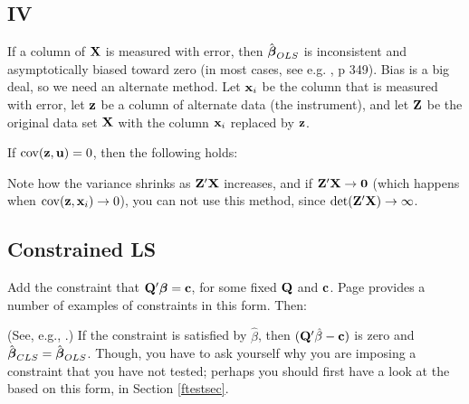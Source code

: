 
\subsection{IV}  
	\label{IV} 
If a column of ${\bf X}$ is measured with error, then $\hat{{\mbox{\boldmath$\beta$}}}_{OLS}$ is
inconsistent and asymptotically biased toward zero (in most cases, see
e.g. \cite{kmenta}, p 349). Bias is a big deal, so we need an alternate
method. Let ${\bf x}_i$ be the column that is measured with error, let
${\bf z}$ be a column of alternate data (the instrument), and let ${\bf Z}$ be
the original data set ${\bf X}$ with the column ${\bf x}_i$ replaced by ${\bf z}$.

If $\operatorname{cov}({\bf z},{\bf u})=0$, then the following holds:


Note how the variance shrinks as ${\bf Z}'{\bf X}$ increases, and if
${\bf Z}'{\bf X} \to {\bf 0}$ (which happens when $\operatorname{cov}({\bf z}, {\bf x}_i)\to 0$),
you can not use this method, since $\det({\bf Z}'{\bf X}) \to \infty$.

\subsection{Constrained LS }
\label{constrainedls}

Add the constraint that ${\bf Q}'{\mbox{\boldmath$\beta$}}={\bf c}$, for some fixed ${\bf Q}$ and ${\bf c}$. 
Page \pageref{ftestsec} provides a number of examples of constraints in
this form. Then:

(See, e.g., \cite{amemiya:ez}.)
If the constraint is satisfied by $\hat\beta$, then
$({\bf Q}'\hat\beta-{\bf c})$ is zero and $\hat{{\mbox{\boldmath$\beta$}}}_{CLS}=\hat{{\mbox{\boldmath$\beta$}}}_{OLS}$.
Though, you have to ask yourself why you are imposing a constraint that
you have not tested; perhaps you should first have a look at the 
based on this form, in Section \ref{ftestsec}.

